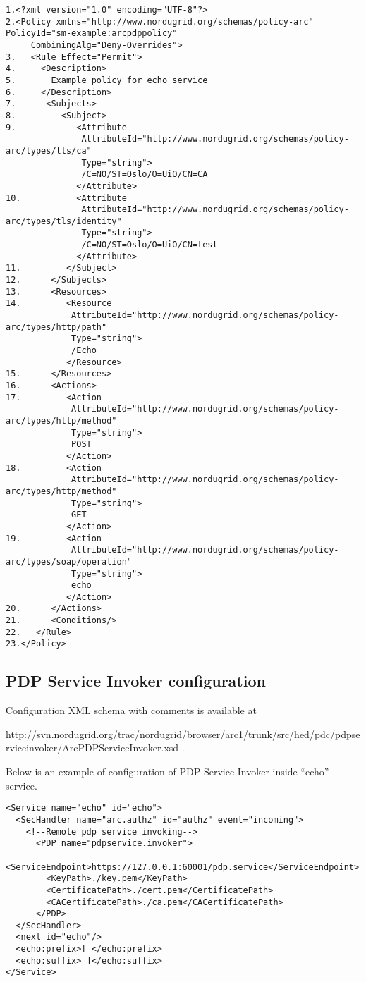 \documentclass{book}
\begin{document}
\begin{verbatim}
1.<?xml version="1.0" encoding="UTF-8"?>
2.<Policy xmlns="http://www.nordugrid.org/schemas/policy-arc" PolicyId="sm-example:arcpdppolicy" 
     CombiningAlg="Deny-Overrides">
3.   <Rule Effect="Permit">
4.     <Description>
5.       Example policy for echo service
6.     </Description>
7.      <Subjects>
8.         <Subject>
9.            <Attribute 
               AttributeId="http://www.nordugrid.org/schemas/policy-arc/types/tls/ca" 
               Type="string">
               /C=NO/ST=Oslo/O=UiO/CN=CA
              </Attribute>
10.           <Attribute 
               AttributeId="http://www.nordugrid.org/schemas/policy-arc/types/tls/identity" 
               Type="string">
               /C=NO/ST=Oslo/O=UiO/CN=test
              </Attribute>
11.         </Subject>
12.      </Subjects>
13.      <Resources>
14.         <Resource 
             AttributeId="http://www.nordugrid.org/schemas/policy-arc/types/http/path" 
             Type="string">
             /Echo
            </Resource>
15.      </Resources>
16.      <Actions>
17.         <Action 
             AttributeId="http://www.nordugrid.org/schemas/policy-arc/types/http/method" 
             Type="string">
             POST
            </Action>
18.         <Action 
             AttributeId="http://www.nordugrid.org/schemas/policy-arc/types/http/method" 
             Type="string">
             GET
            </Action>
19.         <Action 
             AttributeId="http://www.nordugrid.org/schemas/policy-arc/types/soap/operation" 
             Type="string">
             echo
            </Action>
20.      </Actions>
21.      <Conditions/>
22.   </Rule>
23.</Policy>
\end{verbatim}


\subsection{PDP Service Invoker configuration} %
\label{subsec:pdpservice_invoker_conf}
Configuration XML schema with comments is available at 

http://svn.nordugrid.org/trac/nordugrid/browser/arc1/trunk/src/hed/pdc/pdpserviceinvoker/ArcPDPServiceInvoker.xsd .

Below is an example of configuration of PDP Service Invoker inside ``echo'' service.

\begin{verbatim}
<Service name="echo" id="echo">
  <SecHandler name="arc.authz" id="authz" event="incoming">
    <!--Remote pdp service invoking-->
      <PDP name="pdpservice.invoker">
        <ServiceEndpoint>https://127.0.0.1:60001/pdp.service</ServiceEndpoint>
        <KeyPath>./key.pem</KeyPath>
        <CertificatePath>./cert.pem</CertificatePath>
        <CACertificatePath>./ca.pem</CACertificatePath>
      </PDP>
  </SecHandler>
  <next id="echo"/>
  <echo:prefix>[ </echo:prefix>
  <echo:suffix> ]</echo:suffix>
</Service>
\end{verbatim}
\end{document}
